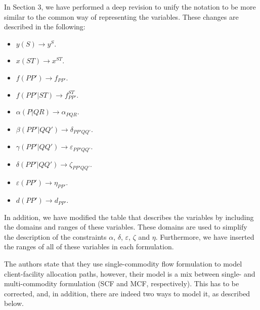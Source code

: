 \documentclass{article}
\newenvironment{reviewer}{\setcounter{pointcounter}{1}}{}
\newcommand{\point}{\text{{\selectfont \thepointcounter} \stepcounter{pointcounter}}}
\begin{document}
\begin{reviewer}
		\begin{tcolorbox}[breakable,enhanced,coltitle=black,colback=green!5!white,colframe=green!75!black,title=\textbf{Answer R2.\point},borderline={1pt}{0pt}{black},boxrule=0pt]
			In Section 3, we have performed a deep revision to unify the notation to be more similar to the common way of representing the variables. These changes are described in the following:
			\begin{itemize}
				\item $y(S)\rightarrow y^S$.
				\item $x(ST)\rightarrow x^{ST}$.
				\item $f(PP')\rightarrow f_{PP'}$.
				\item $f(PP'|ST)\rightarrow f_{PP'}^{ST}$.
				\item $\alpha(P|QR)\rightarrow \alpha_{PQR}$.
				\item $\beta(PP'|QQ')\rightarrow \delta_{PP'QQ'}$.
				\item $\gamma(PP'|QQ')\rightarrow \varepsilon_{PP'QQ'}$.
				\item $\delta(PP'|QQ')\rightarrow \zeta_{PP'QQ'}$.
				\item $\varepsilon(PP')\rightarrow \eta_{PP'}$.
				\item $d(PP')\rightarrow d_{PP'}$.
			\end{itemize}
			
			In addition, we have modified the table that describes the variables by including the domains and ranges of these variables. These domains are used to simplify the description of the constraints $\alpha$, $\delta$, $\varepsilon$, $\zeta$ and $\eta$. Furthermore, we have inserted the ranges of all of these variables in each formulation.
			
			
		\end{tcolorbox}
			
		\begin{itshape}
			 The authors state that they use single-commodity flow formulation to model client-facility allocation paths, however, their model is a mix between single- and multi-commodity formulation (SCF and MCF, respectively). This has to be corrected, and, in addition, there are indeed two ways to model it, as described below.
			

\end{itshape}
\end{reviewer}
\end{document}
